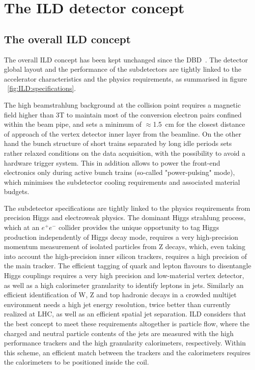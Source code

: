 \chapter{The ILD detector concept}


\section{The overall ILD concept}

The overall ILD concept has been kept unchanged since the DBD~\cite{ild:bib:ILDDBD}. The detector global layout and the performance of the subdetectors are tightly linked to the accelerator characteristics and the physics requirements, as summarised in figure ~\ref{fig:ILD:specifications}. 

The high beamstrahlung background at the collision point requires a magnetic field higher than 3T to maintain most of the conversion electron pairs confined within the beam pipe, and sets a minimum of $\approx$1.5~cm for the closest distance of approach of the vertex detector inner layer from the beamline. On the other hand the bunch structure of short trains separated by long idle periods sets rather relaxed conditions on the data acquisition, with the possibility to avoid a hardware trigger system. This in addition allows to power the front-end electronics only during active bunch trains (so-called "power-pulsing" mode), which minimises the subdetector cooling requirements and associated material budgets.  

The subdetector specifications are tightly linked to the physics requirements from precision Higgs and electroweak physics. The dominant Higgs strahlung process, which at an $e^+e^-$ collider provides the unique opportunity to tag Higgs production independently of Higgs decay mode, requires a very high-precision momentum measurement of isolated particles from Z decays, which, even taking into account the high-precision inner silicon trackers, requires a high precision of the main tracker. The efficient tagging of quark and lepton flavours to disentangle Higgs couplings requires a very high precision and low-material vertex detector, as well as a high calorimeter granularity to identify leptons in jets. Similarly an efficient identification of W, Z and top hadronic decays in a crowded multijet environment needs a high jet energy resolution, twice better than currently realized at LHC, as well as an efficient spatial jet separation. ILD considers that the best concept to meet these requirements altogether is particle flow, where the charged and neutral particle contents of the jets are measured with the high performance trackers and the high granularity calorimeters, respectively. Within this scheme, an efficient match between the trackers and the calorimeters requires the calorimeters to be positioned inside the coil.     


